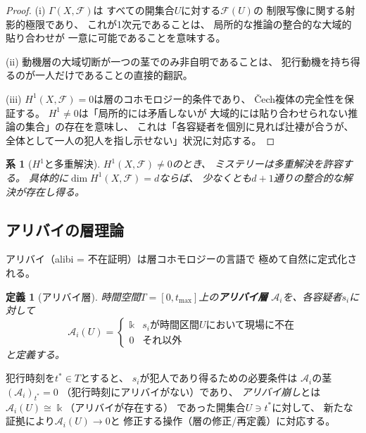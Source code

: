 \documentclass[12pt,twocolumn]{ltjsarticle}
\newtheorem{corollary}[theorem]{系}
\newtheorem{definition}[theorem]{定義}
\newcommand{\kk}{\Bbbk}
\begin{document}
\begin{proof}
(i) $\Gamma(X, \mathcal{F})$は
すべての開集合$U$に対する$\mathcal{F}(U)$の
制限写像に関する射影的極限であり、
これが1次元であることは、
局所的な推論の整合的な大域的貼り合わせが
一意に可能であることを意味する。

(ii) 動機層の大域切断が一つの茎でのみ非自明であることは、
犯行動機を持ち得るのが一人だけであることの直接的翻訳。

(iii) $H^1(X, \mathcal{F}) = 0$は層のコホモロジー的条件であり、
\v{C}ech複体の完全性を保証する。
$H^1 \neq 0$は「局所的には矛盾しないが
大域的には貼り合わせられない推論の集合」の存在を意味し、
これは「各容疑者を個別に見れば辻褄が合うが、
全体として一人の犯人を指し示せない」状況に対応する。
\end{proof}

\begin{corollary}[$H^1$と多重解決]
$H^1(X, \mathcal{F}) \neq 0$のとき、
ミステリーは多重解決を許容する。
具体的に$\dim H^1(X, \mathcal{F}) = d$ならば、
少なくとも$d + 1$通りの整合的な解決が存在し得る。
\end{corollary}


\subsection{アリバイの層理論}

アリバイ（alibi = 不在証明）は層コホモロジーの言語で
極めて自然に定式化される。

\begin{definition}[アリバイ層]
\label{def:alibi_sheaf}
時間空間$T = [0, t_{\max}]$上の\textbf{アリバイ層}
$\mathcal{A}_i$を、各容疑者$s_i$に対して
\begin{equation}
\mathcal{A}_i(U) = \begin{cases}
\kk & \text{$s_i$が時間区間$U$において現場に不在} \\
0 & \text{それ以外}
\end{cases}
\end{equation}
と定義する。
\end{definition}

犯行時刻を$t^* \in T$とすると、
$s_i$が犯人であり得るための必要条件は
$\mathcal{A}_i$の茎$(\mathcal{A}_i)_{t^*} = 0$
（犯行時刻にアリバイがない）であり、
\emph{アリバイ崩し}とは
$\mathcal{A}_i(U) \cong \kk$（アリバイが存在する）
であった開集合$U \ni t^*$に対して、
新たな証拠により$\mathcal{A}_i(U) \to 0$と
修正する操作（層の修正/再定義）に対応する。
\end{document}
